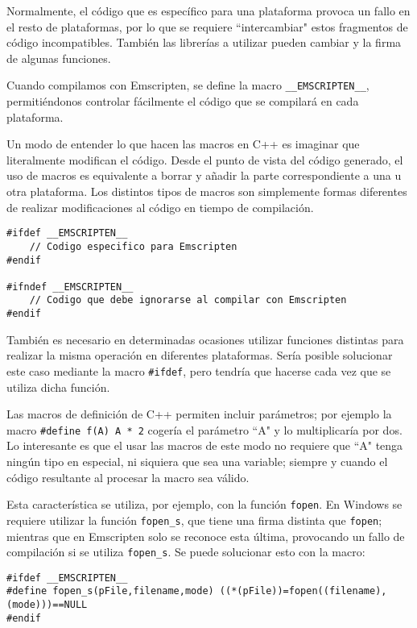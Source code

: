 Normalmente, el código que es específico para una plataforma provoca un fallo en el resto de plataformas, por lo que se requiere ``intercambiar" estos fragmentos de código incompatibles. También las librerías a utilizar pueden cambiar y la firma de algunas funciones.

Cuando compilamos con Emscripten, se define la macro \texttt{\_\_EMSCRIPTEN\_\_}, permitiéndonos controlar fácilmente el código que se compilará en cada plataforma.

Un modo de entender lo que hacen las macros en C++ es imaginar que literalmente modifican el código. Desde el punto de vista del código generado, el uso de macros es equivalente a borrar y añadir la parte correspondiente a una u otra plataforma. Los distintos tipos de macros son simplemente formas diferentes de realizar modificaciones al código en tiempo de compilación.

\begin{lstlisting}
#ifdef __EMSCRIPTEN__
    // Codigo especifico para Emscripten
#endif

#ifndef __EMSCRIPTEN__
    // Codigo que debe ignorarse al compilar con Emscripten
#endif
\end{lstlisting}

También es necesario en determinadas ocasiones utilizar funciones distintas para realizar la misma operación en diferentes plataformas. Sería posible solucionar este caso mediante la macro \texttt{\#ifdef}, pero tendría que hacerse cada vez que se utiliza dicha función.

Las macros de definición de C++ permiten incluir parámetros; por ejemplo la macro \texttt{\#define f(A) A * 2} cogería el parámetro ``A" y lo multiplicaría por dos. Lo interesante es que el usar las macros de este modo no requiere que ``A" tenga ningún tipo en especial, ni siquiera que sea una variable; siempre y cuando el código resultante al procesar la macro sea válido.

Esta característica se utiliza, por ejemplo, con la función \texttt{fopen}. En Windows se requiere utilizar la función \texttt{fopen\_s}, que tiene una firma distinta que \texttt{fopen}; mientras que en Emscripten solo se reconoce esta última, provocando un fallo de compilación si se utiliza \texttt{fopen\_s}. Se puede solucionar esto con la macro:

\begin{lstlisting}
#ifdef __EMSCRIPTEN__
#define fopen_s(pFile,filename,mode) ((*(pFile))=fopen((filename),(mode)))==NULL
#endif
\end{lstlisting}

